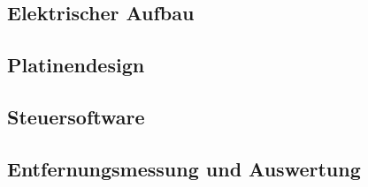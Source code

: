 \begin{comment}
------------------------------------------------------------------------------------------
\end{comment}
\subsection{Elektrischer Aufbau}

\begin{comment}
Wie lange halten die Batterien durch?
	- 4.7 m, LOS, Start 13:50-23:50, 12:50-20:00
\end{comment}


\begin{comment}
------------------------------------------------------------------------------------------
\end{comment}
\subsection{Platinendesign}

\begin{comment}
\end{comment}


\begin{comment}
------------------------------------------------------------------------------------------
\end{comment}
\subsection{Steuersoftware}


\begin{comment}
------------------------------------------------------------------------------------------
\end{comment}
\subsection{Entfernungsmessung und Auswertung}

\begin{comment}
- Mit welchen Einstellungen kommt man auf die Entfernungsmessung?
- Streuung?
- LOS/NLOS {Holz, Bücher, Menschlicher Körper}
	- Welcher Fehler ergibt zwischen LOS/NLOS?
- Wie verändert sich die Genauigkeit der Entfernungsmessung bei einer direkten Sichtverbindung (engl. Line--of--sight (LOS)) und indirekten Sichtverbindung (engl. Non--line--of--sight (NLOS))?
\end{comment}

